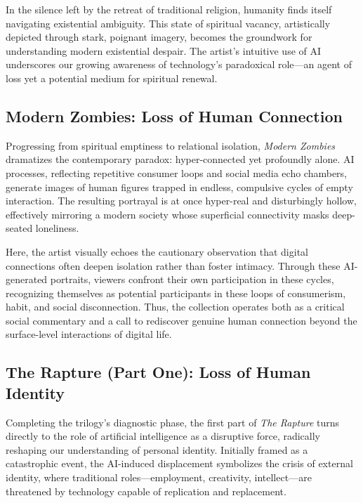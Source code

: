 \documentclass[12pt]{article}
\begin{document}
In the silence left by the retreat of traditional religion, humanity finds itself navigating existential ambiguity. This state of spiritual vacancy, artistically depicted through stark, poignant imagery, becomes the groundwork for understanding modern existential despair. The artist’s intuitive use of AI underscores our growing awareness of technology's paradoxical role—an agent of loss yet a potential medium for spiritual renewal.

\subsection{Modern Zombies: Loss of Human Connection}

Progressing from spiritual emptiness to relational isolation, \textit{Modern Zombies} dramatizes the contemporary paradox: hyper-connected yet profoundly alone. AI processes, reflecting repetitive consumer loops and social media echo chambers, generate images of human figures trapped in endless, compulsive cycles of empty interaction. The resulting portrayal is at once hyper-real and disturbingly hollow, effectively mirroring a modern society whose superficial connectivity masks deep-seated loneliness.

Here, the artist visually echoes the cautionary observation that digital connections often deepen isolation rather than foster intimacy. Through these AI-generated portraits, viewers confront their own participation in these cycles, recognizing themselves as potential participants in these loops of consumerism, habit, and social disconnection. Thus, the collection operates both as a critical social commentary and a call to rediscover genuine human connection beyond the surface-level interactions of digital life.

\subsection{The Rapture (Part One): Loss of Human Identity}

Completing the trilogy’s diagnostic phase, the first part of \textit{The Rapture} turns directly to the role of artificial intelligence as a disruptive force, radically reshaping our understanding of personal identity. Initially framed as a catastrophic event, the AI-induced displacement symbolizes the crisis of external identity, where traditional roles—employment, creativity, intellect—are threatened by technology capable of replication and replacement.
\end{document}
